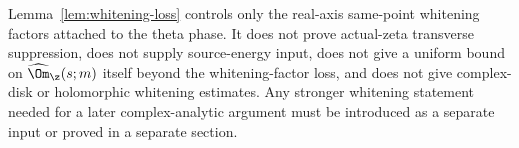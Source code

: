 \begin{remark}
\label{rem:whitening-loss-scope}
Lemma~\ref{lem:whitening-loss} controls only the real-axis same-point
whitening factors attached to the theta phase.  It does not prove
actual-zeta transverse suppression, does not supply source-energy
input, does not give a uniform bound on \(\widehat\Om_\z(s;m)\) itself
beyond the whitening-factor loss, and does not give complex-disk or
holomorphic whitening estimates.  Any stronger whitening statement
needed for a later complex-analytic argument must be introduced as a
separate input or proved in a separate section.
\end{remark}
